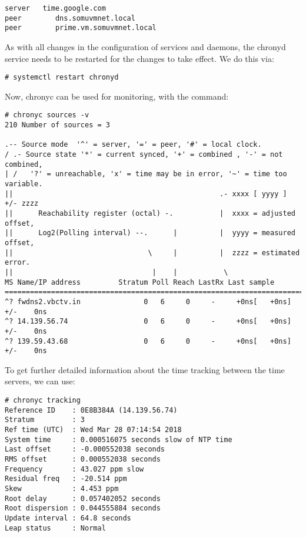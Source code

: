 \vspace{-15pt}
\begin{verbatim}
server 	 time.google.com
peer		dns.somuvmnet.local
peer		prime.vm.somuvmnet.local
\end{verbatim}
\vspace{-10pt}	

\noindent
As with all changes in the configuration of services and daemons, the chronyd service needs to be restarted for the changes to take effect. We do this via:

\vspace{-15pt}
\begin{verbatim}
# systemctl restart chronyd
\end{verbatim}
\vspace{-10pt}	

\noindent
Now, chronyc can be used for monitoring, with the command:

\vspace{-15pt}
\begin{verbatim}
# chronyc sources -v
210 Number of sources = 3

.-- Source mode  '^' = server, '=' = peer, '#' = local clock.
/ .- Source state '*' = current synced, '+' = combined , '-' = not combined,
| /   '?' = unreachable, 'x' = time may be in error, '~' = time too variable.
||                                                 .- xxxx [ yyyy ] +/- zzzz
||      Reachability register (octal) -.           |  xxxx = adjusted offset,
||      Log2(Polling interval) --.      |          |  yyyy = measured offset,
||                                \     |          |  zzzz = estimated error.
||                                 |    |           \
MS Name/IP address         Stratum Poll Reach LastRx Last sample               
===============================================================================
^? fwdns2.vbctv.in               0   6     0     -     +0ns[   +0ns] +/-    0ns
^? 14.139.56.74                  0   6     0     -     +0ns[   +0ns] +/-    0ns
^? 139.59.43.68                  0   6     0     -     +0ns[   +0ns] +/-    0ns
\end{verbatim}
\vspace{-10pt}	

\noindent
To get further detailed information about the time tracking between the time servers, we can use:

\vspace{-15pt}
\begin{verbatim}
# chronyc tracking
Reference ID    : 0E8B384A (14.139.56.74)
Stratum         : 3
Ref time (UTC)  : Wed Mar 28 07:14:54 2018
System time     : 0.000516075 seconds slow of NTP time
Last offset     : -0.000552038 seconds
RMS offset      : 0.000552038 seconds
Frequency       : 43.027 ppm slow
Residual freq   : -20.514 ppm
Skew            : 4.453 ppm
Root delay      : 0.057402052 seconds
Root dispersion : 0.044555884 seconds
Update interval : 64.8 seconds
Leap status     : Normal
\end{verbatim}
\vspace{-10pt}	

